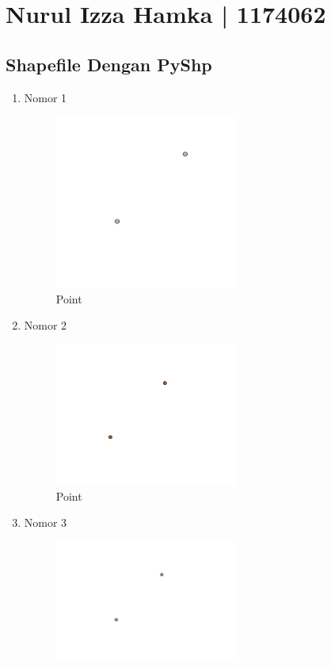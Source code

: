 \section{Nurul Izza Hamka | 1174062}
\subsection{Shapefile Dengan PyShp}
\begin{enumerate}
	\item Nomor 1
	
	\begin{figure}[H]
		\includegraphics[width=6cm]{figures/Tugas2/1174062/Soal1.png}
		\centering
		\caption{Point}
	\end{figure}
	\item Nomor 2
	
	\begin{figure}[H]
		\includegraphics[width=6cm]{figures/Tugas2/1174062/Soal2.png}
		\centering
		\caption{Point}
	\end{figure}
	\item Nomor 3
	
	\begin{figure}[H]
		\includegraphics[width=6cm]{figures/Tugas2/1174062/Soal3.png}

\end{figure}
\end{enumerate}
